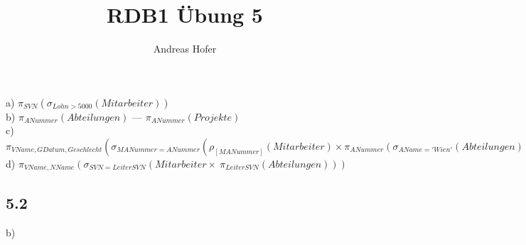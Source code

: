 \documentclass{article}
\title{\vspace{-1cm}RDB1 Übung 5}
\author{Andreas Hofer}
\begin{document}
	\maketitle
	a) $\pi_{SVN}(\sigma_{Lohn > 5000}(Mitarbeiter))$ \\
	b) $\pi_{ANummer}(Abteilungen)$ --- $\pi_{ANummer}(Projekte)$ \\
	c) $\pi_{VName, GDatum, Geschlecht}(\sigma_{MANummer=ANummer}(\rho_{[MANummer]}(Mitarbeiter)\times\pi_{ANummer}(\sigma_{AName='Wien'}(Abteilungen))))$ \\
	d) $\pi_{VName, NName}(\sigma_{SVN=LeiterSVN}(Mitarbeiter \times\ \pi_{LeiterSVN}(Abteilungen)))$
	\subsection{5.2}
	b) $$
\end{document}
